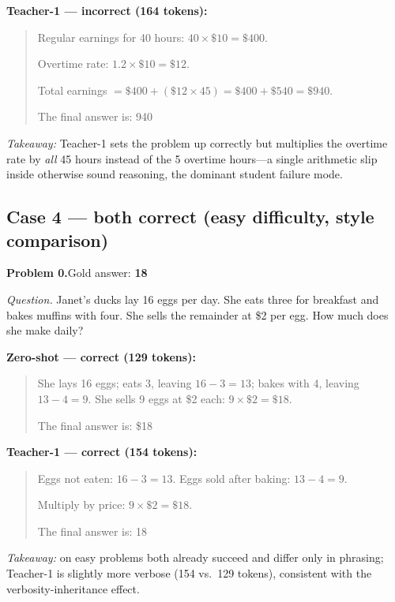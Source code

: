 \documentclass[11pt]{article}
\begin{document}
\noindent\textbf{Teacher-1 --- incorrect (164 tokens):}
\begin{quote}\small
Regular earnings for 40 hours: $40 \times \$10 = \$400$.

Overtime rate: $1.2 \times \$10 = \$12$.

Total earnings $= \$400 + (\$12 \times 45) = \$400 + \$540 = \$940$.

The final answer is: 940
\end{quote}
\emph{Takeaway:} Teacher-1 sets the problem up correctly but multiplies the
overtime rate by \emph{all} 45 hours instead of the 5 overtime hours---a single
arithmetic slip inside otherwise sound reasoning, the dominant student failure mode.

\subsection*{Case 4 --- both correct (easy difficulty, style comparison)}
\noindent\textbf{Problem 0.}\quad Gold answer: \textbf{18}

\textit{Question.} Janet's ducks lay 16 eggs per day. She eats three for breakfast
and bakes muffins with four. She sells the remainder at \$2 per egg. How much does
she make daily?

\noindent\textbf{Zero-shot --- correct (129 tokens):}
\begin{quote}\small
She lays 16 eggs; eats 3, leaving $16 - 3 = 13$; bakes with 4, leaving $13 - 4 = 9$.
She sells 9 eggs at \$2 each: $9 \times \$2 = \$18$.

The final answer is: \$18
\end{quote}

\noindent\textbf{Teacher-1 --- correct (154 tokens):}
\begin{quote}\small
Eggs not eaten: $16 - 3 = 13$. Eggs sold after baking: $13 - 4 = 9$.

Multiply by price: $9 \times \$2 = \$18$.

The final answer is: 18
\end{quote}
\emph{Takeaway:} on easy problems both already succeed and differ only in phrasing;
Teacher-1 is slightly more verbose (154 vs.\ 129 tokens), consistent with the
verbosity-inheritance effect.
\end{document}
